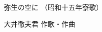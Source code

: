 \documentclass[10pt,b5j]{tarticle} %
\begin{document}
\begin{minipage}[c]{0.7\hsize} %
    \begin{center}
        {\LARGE
            弥生の空に %
        }
        {\small 
            （昭和十五年寮歌） %
        }
    \end{center}
\end{minipage}
\begin{minipage}[c]{0.3\hsize} %
    \begin{flushright} %
        大井徹夫君 作歌・作曲 %
    \end{flushright}
\end{minipage}
\end{document}
